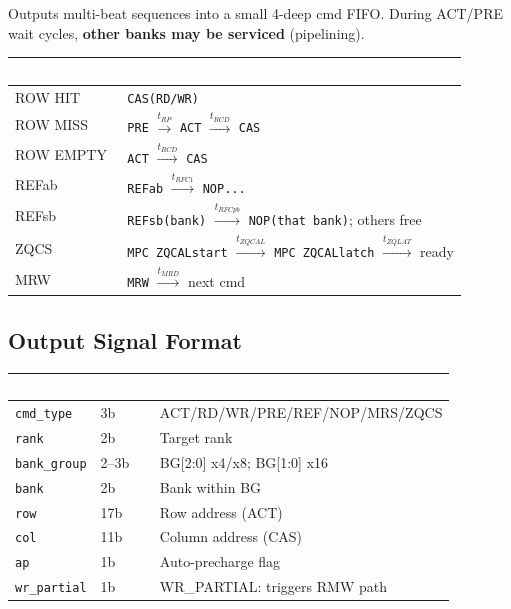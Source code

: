 \documentclass[11pt,a4paper]{article}
\newcommand{\THead}[1]{\cellcolor{navy}\textcolor{white}{\small\textbf{#1}}}
\newcommand{\RA}{\rowcolor{lgray}}
\newcommand{\RB}{\rowcolor{sky!30}}
\begin{document}
Outputs multi-beat sequences into a small 4-deep cmd FIFO.
During ACT/PRE wait cycles, \textbf{other banks may be serviced} (pipelining).

\begin{center}
\begin{tabularx}{\linewidth}{@{} l l @{}}
\toprule
\THead{Page Decision} & \THead{Emitted Sequence} \\
\midrule
\RA ROW HIT  & \texttt{CAS(RD/WR)} \\
\RB ROW MISS & \texttt{PRE} $\xrightarrow{t_{RP}}$ \texttt{ACT} $\xrightarrow{t_{RCD}}$ \texttt{CAS} \\
\RA ROW EMPTY & \texttt{ACT} $\xrightarrow{t_{RCD}}$ \texttt{CAS} \\
\RB REFab & \texttt{REFab} $\xrightarrow{t_{RFC1}}$ \texttt{NOP...} \\
\RA REFsb & \texttt{REFsb(bank)} $\xrightarrow{t_{RFCpb}}$ \texttt{NOP(that bank)}; others free \\
\RB ZQCS & \texttt{MPC ZQCALstart} $\xrightarrow{t_{ZQCAL}}$ \texttt{MPC ZQCALlatch}
  $\xrightarrow{t_{ZQLAT}}$ ready \\
\RA MRW & \texttt{MRW} $\xrightarrow{t_{MRD}}$ next cmd \\
\bottomrule
\end{tabularx}
\end{center}

\subsection{Output Signal Format}

\begin{center}
\begin{tabularx}{0.9\linewidth}{@{} l l X @{}}
\toprule
\THead{Field} & \THead{Width} & \THead{Description} \\
\midrule
\RA \texttt{cmd\_type} & 3b & ACT/RD/WR/PRE/REF/NOP/MRS/ZQCS \\
\RB \texttt{rank}      & 2b & Target rank \\
\RA \texttt{bank\_group} & 2--3b & BG[2:0] x4/x8; BG[1:0] x16 \\
\RB \texttt{bank}      & 2b & Bank within BG \\
\RA \texttt{row}       & 17b & Row address (ACT) \\
\RB \texttt{col}       & 11b & Column address (CAS) \\
\RA \texttt{ap}        & 1b & Auto-precharge flag \\
\RB \texttt{wr\_partial} & 1b & WR\_PARTIAL: triggers RMW path \\
\bottomrule
\end{tabularx}
\end{center}
\end{document}
